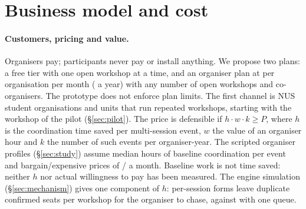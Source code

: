 \section{Business model and cost}\label{sec:business}

\paragraph{Customers, pricing and value.}
Organisers pay; participants never pay or install anything. We propose two plans: a free tier with
one open workshop at a time, and an organiser plan at  per organisation per month ( a
year) with any number of open workshops and co-organisers. The prototype does not enforce plan
limits. The first channel is NUS student
organisations and units that run repeated workshops, starting with the workshop of the
pilot (\S\ref{sec:pilot}). The price is defensible if
$h \cdot w \cdot k \geq P$, where $h$ is the coordination time saved per multi-session event, $w$
the value of an organiser hour and $k$ the number of such events per organiser-year. The scripted
organiser profiles (\S\ref{sec:study}) assume median \SimCoordinationHours{} hours of baseline
coordination per event and bargain/expensive prices of \sd\SimBargainSgd/\sd\SimExpensiveSgd{} a month.
Baseline work is not time saved: neither $h$ nor actual willingness to pay has been measured.
The engine simulation (\S\ref{sec:mechanism}) gives one
component of $h$: per-session forms leave \ReplayDupConfirmedPerSessionMean{} duplicate confirmed
seats per workshop for the organiser to chase, against \ReplayDupConfirmedUnifiedMean{} with one
queue.

